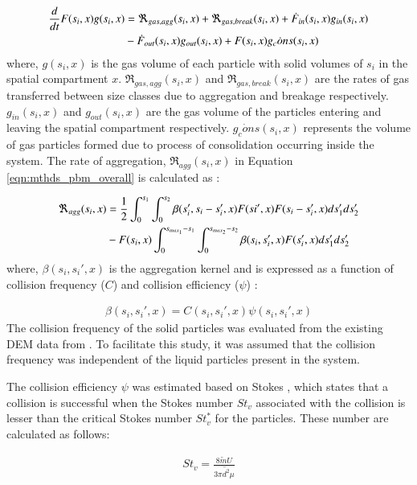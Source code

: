 \documentclass[preprint,10pt,authoryear,review]{elsarticle}
\begin{document}
\begin{linenumbers}
\begin{align}
\frac{d}{dt}F(s_i,x)g(s_i,x)&= 
\Re_{gas,agg}(s_i,x)+\Re_{gas,break}(s_i,x)+\dot{F}_{in}(s_i,x)g_{in}(s_i,x)\notag\\
&-\dot{F}_{out}(s_i,x)g_{out}(s_i,x)+F(s_i,x)\dot{g_cons}(s_i,x)
\label{eqn:mthds_pbm_gas_agg} 
\end{align}
where, $g(s_i,x)$ is the gas volume of each particle with solid volumes of $s_i$ 
in the spatial compartment $x$. $\Re_{gas,agg}(s_i,x)$ and $\Re_{gas,break}(s_i,x)$ are 
the rates of gas transferred between size classes due to aggregation and breakage respectively. 
$g_{in}(s_i,x)$ and $g_{out}(s_i,x)$ are the gas volume of the particles entering and 
leaving the spatial compartment respectively. $\dot{g_cons}(s_i,x)$ represents the volume of 
gas particles formed due to process of consolidation occurring inside the system. The 
rate of aggregation, $\Re_{agg}(s_i,x)$ in Equation \ref{eqn:mthds_pbm_overall} is 
calculated as \citep{Chaturbedi2017}:

\begin{align}
\Re_{agg}(s_i,x)&= \frac{1}{2}\int _0^{s_1} \int_0^{s_2} 
\beta(s_i',s_i-s_i',x)F(si',x)F(s_i-s_i',x)ds_1'ds_2'\notag\\ 
&- F(s_i,x)\int _0^{s_{max_1}-s_1} \int_0^{s_{max_2}-s_2} 
\beta(s_i,s_i',x)F(s_i',x)ds_1'ds_2'
\label{eqn:mthds_R_agg}
\end{align}
where, $\beta(s_i, s_i',x)$ is the aggregation kernel and is expressed as a 
function of collision frequency ($C$) and collision efficiency ($\psi$) 
\citep{Barrasso2015ces}: 

\begin{align}
\beta(s_i,s_i',x)=C(s_i,s_i',x)\psi(s_i,s_i',x)
\label{eqn:mthds_pbm_beta_kernal}
\end{align}
The collision frequency of the solid particles was evaluated from the existing 
DEM data from \citep{Sampat2018}. To facilitate this study, it was assumed that
the collision frequency was independent of the liquid particles present in the 
system.

The collision efficiency $\psi$ was estimated based on Stokes , which 
states that a collision is successful when the Stokes number $St_v$ associated 
with the collision is lesser than the critical Stokes number ${St^*_v}$ for the 
particles. These number are calculated as follows:

\begin{align}
St_v=\frac{8\tilde{m}U}{3\pi\tilde{d^2}\mu}
\label{eqn:mthds_pbm_agg_Stnum}
\end{align}


\end{linenumbers}
\end{document}
